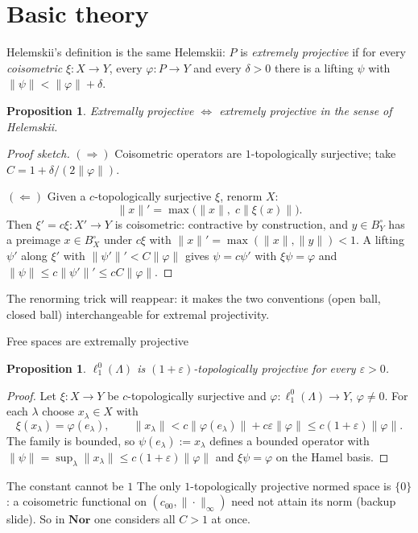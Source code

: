 \documentclass[10pt,aspectratio=169]{beamer}
\newtheorem{proposition}[theorem]{Proposition}
\newcommand{\Nor}{\mathbf{Nor}}
\newcommand{\lo}[1]{\ell_1^0(#1)}
\begin{document}
\section{Basic theory}

\begin{frame}{Helemskii's definition is the same}
  Helemskii: $P$ is \emph{extremely projective} if for every \emph{coisometric}
  $\xi\colon X\to Y$, every $\varphi\colon P\to Y$ and every $\delta>0$ there
  is a lifting $\psi$ with $\|\psi\|<\|\varphi\|+\delta$.
  \begin{proposition}
    Extremally projective $\iff$ extremely projective in the sense of Helemskii.
  \end{proposition}
  \begin{proof}[Proof sketch]
    $(\Rightarrow)$ Coisometric operators are $1$-topologically surjective;
    take $C=1+\delta/(2\|\varphi\|)$.

    $(\Leftarrow)$ Given a $c$-topologically surjective $\xi$, renorm $X$:
    \[
      \|x\|'=\max\bigl(\|x\|,\;c\|\xi(x)\|\bigr).
    \]
    Then $\xi'=c\xi\colon X'\to Y$ is coisometric: contractive by construction,
    and $y\in B_Y^\circ$ has a preimage $x\in B_X^\circ$ under $c\xi$ with
    $\|x\|'=\max(\|x\|,\|y\|)<1$. A lifting $\psi'$ along $\xi'$ with
    $\|\psi'\|'<C\|\varphi\|$ gives $\psi=c\psi'$ with $\xi\psi=\varphi$ and
    $\|\psi\|\le c\|\psi'\|'\le cC\|\varphi\|$.
  \end{proof}
  The renorming trick will reappear: it makes the two conventions (open ball,
  closed ball) interchangeable for extremal projectivity.
\end{frame}

\begin{frame}{Free spaces are extremally projective}
  \begin{proposition}
    $\lo\Lambda$ is $(1+\varepsilon)$-topologically projective for every
    $\varepsilon>0$.
  \end{proposition}
  \begin{proof}
    Let $\xi\colon X\to Y$ be $c$-topologically surjective and
    $\varphi\colon\lo\Lambda\to Y$, $\varphi\ne0$. For each $\lambda$ choose
    $x_\lambda\in X$ with
    \[
      \xi(x_\lambda)=\varphi(e_\lambda),\qquad
      \|x_\lambda\|<c\|\varphi(e_\lambda)\|+c\varepsilon\|\varphi\|\le c(1+\varepsilon)\|\varphi\| .
    \]
    The family is bounded, so $\psi(e_\lambda):=x_\lambda$ defines a bounded
    operator with $\|\psi\|=\sup_\lambda\|x_\lambda\|\le c(1+\varepsilon)\|\varphi\|$
    and $\xi\psi=\varphi$ on the Hamel basis.
  \end{proof}
  \begin{alertblock}{The constant cannot be $1$}
    The only $1$-topologically projective normed space is $\{0\}$: a
    coisometric functional on $(c_{00},\|\cdot\|_\infty)$ need not attain its
    norm (backup slide). So in $\Nor$ one considers all $C>1$ at once.
  \end{alertblock}
\end{frame}
\end{document}
